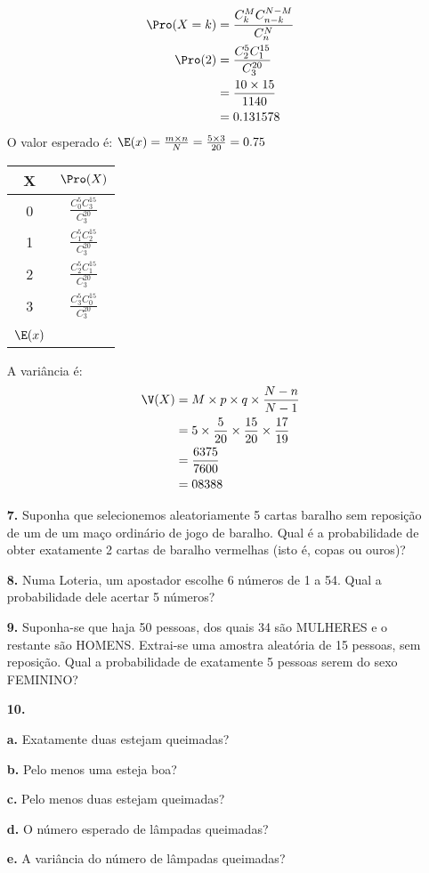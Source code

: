 \begin{itemize}
{	\begin{align*}
	    \Pro(X = k) &= \frac{C_k^MC_{n-k}^{N-M}}{C^N_n}\\
	    \Pro(2) &= \frac{C_2^{5}C_{1}^{15}}{C^{20}_{3}}\\
	    &= \frac{10\times15}{1140}\\
	    &=0.131578
	\end{align*}
	O valor esperado é: $\E(x) = \frac{m\times n}{N} = \frac{5 \times 3}{20} = 0.75$\\
	\ifx
    \begin{tabular}{c|c}
        X & $\Pro(X)$ \\
        \hline\hline
        0 & $\frac{C_0^{5}C_{3}^{15}}{C^{20}_{3}}$\\
        1 & $\frac{C_1^{5}C_{2}^{15}}{C^{20}_{3}}$\\
        2 & $\frac{C_2^{5}C_{1}^{15}}{C^{20}_{3}}$\\
        3 & $\frac{C_3^{5}C_{0}^{15}}{C^{20}_{3}}$ \\
        \hline\hline\\
        $\E(x)$ &
    \end{tabular}
    \fi
	A variância é:
	\begin{align*}
	    \V(X) &= M\times p\times q \times\frac{N-n}{N-1}\\
	    &= 5\times\frac{5}{20}\times\frac{15}{20}\times\frac{17}{19}\\
	    &= \frac{6375}{7600}\\
	    &= 08388
	\end{align*}} 
	\item[\textbf{7.}] Suponha que selecionemos aleatoriamente 5 cartas baralho sem reposição de um de um maço ordinário de jogo de baralho. Qual é a probabilidade de obter exatamente 2 cartas de baralho vermelhas (isto é, copas ou ouros)?
	\resposta{} 
	\item[\textbf{8.}] Numa Loteria, um apostador escolhe 6 números de 1 a 54. Qual a probabilidade dele acertar 5 números?
	\resposta{} 
	\item[\textbf{9.}] Suponha-se que haja 50 pessoas, dos quais 34 são MULHERES e o restante são HOMENS. Extrai-se uma amostra aleatória de 15 pessoas, sem reposição. Qual a probabilidade de exatamente 5 pessoas serem do sexo FEMININO?
	\resposta{} 
	
	\item[\textbf{10.}] 
	    \item[\textbf{a.}] Exatamente duas estejam queimadas?
	    \item[\textbf{b.}] Pelo menos uma esteja boa? \item[\textbf{c.}] Pelo menos duas estejam queimadas?
	    \item[\textbf{d.}] O número esperado de lâmpadas queimadas? \item[\textbf{e.}] A variância do número de lâmpadas queimadas?
	
\end{itemize}